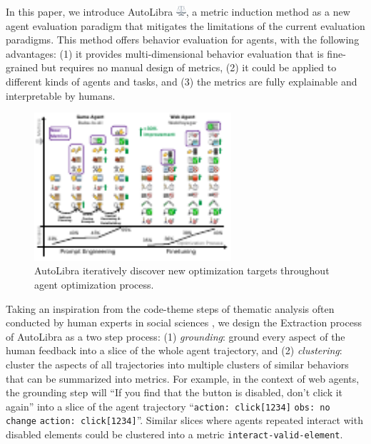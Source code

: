 In this paper, we introduce AutoLibra \protect\includegraphics[height=1em]{figs/scale.png},
a metric induction method as a new agent evaluation paradigm 
that mitigates the limitations of the current evaluation paradigms.
This method offers behavior evaluation for agents, with the following advantages:
(1) it provides multi-dimensional behavior evaluation that is fine-grained but requires no manual design of metrics,
(2) it could be applied to different kinds of agents and tasks, and 
(3) the metrics are fully explainable and interpretable by humans.

\begin{figure}
    \centering
    \includegraphics[width=0.65\textwidth]{figs/autolibra-teaser.pdf}
    \caption{AutoLibra iteratively discover new optimization targets throughout agent optimization process.}
    \label{fig:autolibra-training}
\end{figure}

Taking an inspiration from the code-theme steps of thematic analysis often conducted by human experts
in social sciences \citep{braun2006using},
we design the Extraction process of AutoLibra as a two step process:
(1) \emph{grounding}: ground every aspect of the human feedback into a slice of the whole agent trajectory,
and (2) \emph{clustering}: cluster the aspects of all trajectories into multiple clusters of similar behaviors
that can be summarized into metrics. For example, in the context of web agents, the grounding step will
``\textsf{If you find that the button is disabled, don't click it again}'' into a slice of the agent trajectory
``\texttt{action: click[1234]} \texttt{obs: no change} \texttt{action: click[1234]}''. Similar slices where 
agents repeated interact with disabled elements could be clustered into a metric \texttt{interact-valid-element}. 


